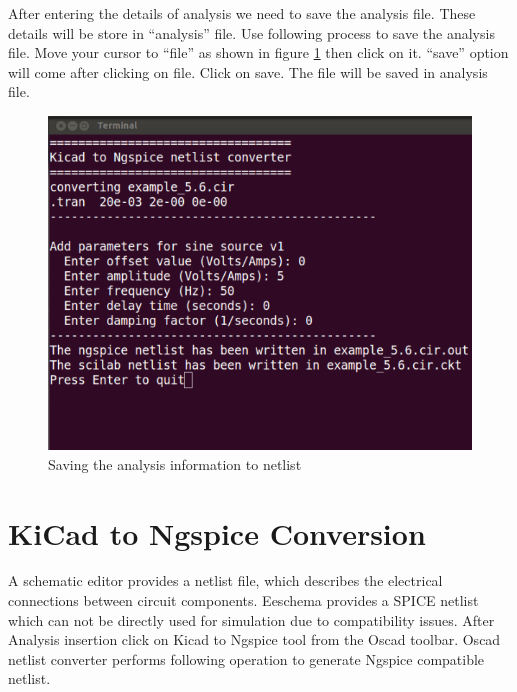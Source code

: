 After entering the details of analysis we need to save the analysis file. These details will be store in “analysis” file. Use following process to save the analysis file.
Move your cursor to “file” as shown in figure \ref{8} then click on it. “save” option will come after clicking on file. Click on save. The file will be saved in analysis file.
\begin{figure}
\centering
\includegraphics[width=\textwidth]{figures/8}
\caption{Saving the analysis information to netlist}
\label{8}
\end{figure}
\section{KiCad to Ngspice Conversion}
A schematic editor provides a netlist file, which describes the electrical connections between circuit components. Eeschema provides a SPICE netlist which can not be directly used for simulation due to compatibility issues. After Analysis insertion click on Kicad to Ngspice tool from the Oscad toolbar. Oscad netlist converter performs following operation to generate Ngspice compatible netlist.
